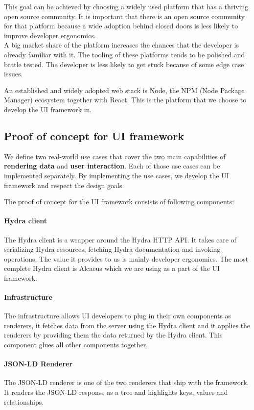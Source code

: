 This goal can be achieved by choosing a widely used platform that has a thriving open source community. It is important that there is an open source community for that platform because a wide adoption behind closed doors is less likely to improve developer ergonomics. \\
A big market share of the platform increases the chances that the developer is already familiar with it. The tooling of these platforms tends to be polished and battle tested. The developer is less likely to get stuck because of some edge case issues.

An established and widely adopted web stack is Node, the NPM (Node Package Manager) ecosystem together with React. This is the platform that we choose to develop the UI framework in.

\subsection{Proof of concept for UI framework}\label{proofofconcept}
We define two real-world use cases that cover the two main capabilities of \textbf{rendering data} and \textbf{user interaction}. Each of those use cases can be implemented separately. By implementing the use cases, we develop the UI framework and respect the design goals.

The proof of concept for the UI framework consists of following components:

\paragraph{Hydra client}
The Hydra client is a wrapper around the Hydra HTTP API. It takes care of serializing Hydra resources, fetching Hydra documentation and invoking operations. The value it provides to us is mainly developer ergonomics. The most complete Hydra client is Alcaeus which we are using as a part of the UI framework.

\paragraph{Infrastructure}
The infrastructure allows UI developers to plug in their own components as renderers, it fetches data from the server using the Hydra client and it applies the renderers by providing them the data returned by the Hydra client. This component glues all other components together.

\paragraph{JSON-LD Renderer}
The JSON-LD renderer is one of the two renderers that ship with the framework. It renders the JSON-LD response as a tree and highlights keys, values and relationships.

